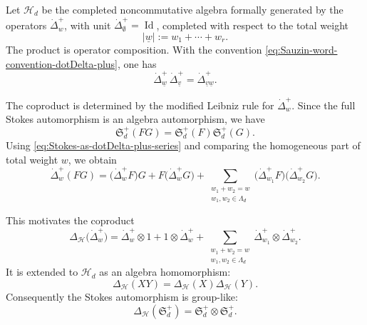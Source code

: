 \documentclass[11pt]{amsart}
\DeclareMathOperator{\Id}{Id}
\theoremstyle{plain}
\begin{document}
Let \(\mathcal H_d\) be the completed noncommutative algebra formally generated
by the operators \(\dot\Delta_w^+\), with unit
\(\dot\Delta_\emptyset^+=\Id\), completed with respect to the total weight
\[
|\underline{w}|:=w_1+\cdots+w_r.
\]
The product is operator composition.  With the convention
\eqref{eq:Sauzin-word-convention-dotDelta-plus}, one has
\begin{equation*}\label{eq:dotDelta-plus-product-opposite-concat}
\dot\Delta_{\underline{w}}^{+}\,
\dot\Delta_{\underline{v}}^{+}
=
\dot\Delta_{\underline{v}\underline{w}}^{+}.
\end{equation*}

The coproduct is determined by the modified Leibniz rule for
\(\dot\Delta_w^+\).  Since the full Stokes automorphism is an algebra
automorphism, we have
\[
\mathfrak S_d^+(FG)=\mathfrak S_d^+(F)\mathfrak S_d^+(G).
\]
Using \eqref{eq:Stokes-as-dotDelta-plus-series} and comparing the homogeneous
part of total weight \(w\), we obtain
\begin{equation*}\label{eq:modified-Leibniz-dotDelta-plus}
\dot\Delta_w^+(FG)
=
\bigl(\dot\Delta_w^+F\bigr)G
+
F\bigl(\dot\Delta_w^+G\bigr)
+
\sum_{\substack{w_1+w_2=w\\ w_1,w_2\in\Lambda_d}}
\bigl(\dot\Delta_{w_1}^+F\bigr)
\bigl(\dot\Delta_{w_2}^+G\bigr).
\end{equation*}

This motivates the coproduct
\begin{equation}\label{eq:dotDelta-plus-coproduct}
\Delta_{\mathcal H}\bigl(\dot\Delta_w^+\bigr)
=
\dot\Delta_w^+\otimes1
+
1\otimes\dot\Delta_w^+
+
\sum_{\substack{w_1+w_2=w\\ w_1,w_2\in\Lambda_d}}
\dot\Delta_{w_1}^+\otimes \dot\Delta_{w_2}^+ .
\end{equation}
It is extended to \(\mathcal H_d\) as an algebra homomorphism:
\[
\Delta_{\mathcal H}(XY)
=
\Delta_{\mathcal H}(X)\Delta_{\mathcal H}(Y).
\]
Consequently the Stokes automorphism is group-like:
\begin{equation*}\label{eq:Stokes-group-like-dotDelta-plus}
\Delta_{\mathcal H}(\mathfrak S_d^+)
=
\mathfrak S_d^+\otimes \mathfrak S_d^+ .
\end{equation*}
\end{document}
